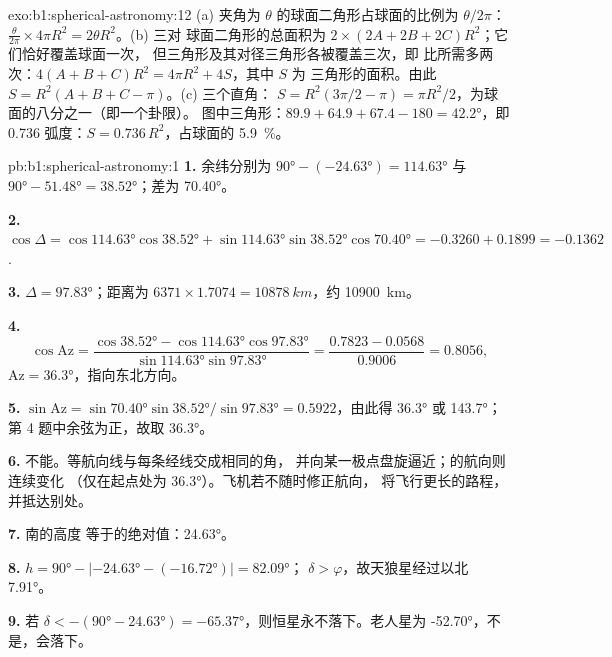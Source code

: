 \begin{solution}{exo:b1:spherical-astronomy:12}
(a) 夹角为 $\theta$ 的球面二角形占球面的比例为 $\theta/2\pi$：
$\frac{\theta}{2\pi}\times4\pi R^2 = 2\theta R^2$。(b) 三对
球面二角形的总面积为 $2\times(2A + 2B + 2C)R^2$；它们恰好覆盖球面一次，
但三角形及其对径三角形各被覆盖三次，即
比所需多两次：$4(A + B + C)R^2 = 4\pi R^2 + 4S$，其中 $S$ 为
三角形的面积。由此 $S = R^2(A + B + C - \pi)$。(c) 三个直角：
$S = R^2(3\pi/2 - \pi) = \pi R^2/2$，为球面的八分之一（即一个卦限）。
图中三角形：$89.9 + 64.9 + 67.4 - 180 = \ang{42.2}$，即
\num{0.736} 弧度：$S = 0.736\,R^2$，占球面的 \qty{5.9}{\percent}。
\end{solution}

\begin{solution}{pb:b1:spherical-astronomy:1}
\textbf{1.} 余纬分别为 $\ang{90} - (\ang{-24.63}) = \ang{114.63}$ 与
$\ang{90} - \ang{51.48} = \ang{38.52}$；差为 \ang{70.40}。

\textbf{2.} $\cos\Delta = \cos\ang{114.63}\cos\ang{38.52} +
\sin\ang{114.63}\sin\ang{38.52}\cos\ang{70.40} = -0.3260 + 0.1899 =
-0.1362$.

\textbf{3.} $\Delta = \ang{97.83}$；距离为 $6371\times1.7074 =
\qty{10878}{km}$，约 \qty{10900}{km}。

\textbf{4.}
\[
  \cos\mathrm{Az} = \frac{\cos\ang{38.52} - \cos\ang{114.63}\cos\ang{97.83}}
  {\sin\ang{114.63}\sin\ang{97.83}} = \frac{0.7823 - 0.0568}{0.9006} = 0.8056 ,
\]
$\mathrm{Az} = \ang{36.3}$，指向东北方向。

\textbf{5.} $\sin\mathrm{Az} = \sin\ang{70.40}\sin\ang{38.52}/\sin\ang{97.83}
= 0.5922$，由此得 \ang{36.3} 或 \ang{143.7}；
第 4 题中余弦为正，故取 \ang{36.3}。

\textbf{6.} 不能。等航向线与每条经线交成相同的角，
并向某一极点盘旋逼近；的航向则连续变化
（仅在起点处为 \ang{36.3}）。飞机若不随时修正航向，
将飞行更长的路程，并抵达别处。

\textbf{7.} 南的高度
等于的绝对值：\ang{24.63}。

\textbf{8.} $h = \ang{90} - |\ang{-24.63} - (\ang{-16.72})| = \ang{82.09}$；
$\delta > \varphi$，故天狼星经过以北 \ang{7.91}。

\textbf{9.} 若 $\delta < -(\ang{90} - \ang{24.63}) =
\ang{-65.37}$，则恒星永不落下。老人星为 \ang{-52.70}，不是，会落下。


\end{solution}
